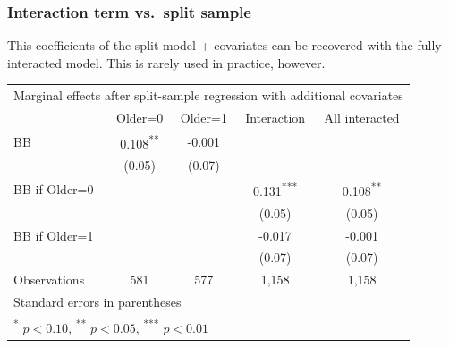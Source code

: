 \documentclass[12pt,english,dvipsnames,aspectratio=169,handout]{beamer}\usepackage[]{graphicx}\usepackage[]{xcolor}
\begin{document}
\begin{frame}
  \frametitle{Interaction term vs.\ split sample}
\footnotesize

This coefficients of the split model + covariates can be recovered with the fully interacted model. This is rarely used in practice, however.
\vspace{5mm}

\tiny
\centering
\begin{tabular}{l*{4}{c}}
\toprule
\multicolumn{5}{c}{Marginal effects after split-sample regression with additional covariates}\\
                & Older=0         & Older=1           &  Interaction  & All interacted \\
\midrule
BB              &    0.108\textsuperscript{**} &   -0.001         &                  &                  \\
                &   (0.05)         &   (0.07)         &                  &                  \\
BB if Older=0   &                  &                  &    0.131\textsuperscript{***}&    0.108\textsuperscript{**} \\
                &                  &                  &   (0.05)         &   (0.05)         \\
BB if Older=1   &                  &                  &   -0.017         &   -0.001         \\
                &                  &                  &   (0.07)         &   (0.07)         \\
\midrule
Observations    &      581         &      577         &     1,158         &     1,158         \\
\bottomrule
\multicolumn{5}{l}{ Standard errors in parentheses}\\
\multicolumn{5}{l}{\textsuperscript{*} \(p<0.10\), \textsuperscript{**} \(p<0.05\), \textsuperscript{***} \(p<0.01\)}\\
\end{tabular}

\vspace{1cm}
\end{frame}
\end{document}
